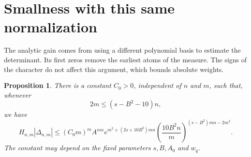 \documentclass[11pt]{article}
\newtheorem{proposition}[theorem]{Proposition}
\theoremstyle{remark}
\numberwithin{equation}{section}
\begin{document}
\section{Smallness with this same normalization}\label{sec:size}
The analytic gain comes from using a different polynomial basis to estimate
the determinant. Its first zeros remove the earliest atoms of the measure.
The signs of the character do not affect this argument, which bounds
absolute weights.

\begin{proposition}\label{prop:size}
There is a constant $C_0>0$, independent of $n$ and $m$, such that, whenever
\begin{equation}\label{eq:size-range}
 2m\leq(s-B^2-10)n,
\end{equation}
we have
\begin{equation}\label{eq:size-bound}
 H_{n,m}|\Delta_{n,m}|
 \leq (C_0m)^m A^{mn}e^{m^2+(2s+10B^2)mn}
       \left(\frac{10B^2 n}{m}\right)^{(s-B^2)mn-2m^2}.
\end{equation}
The constant may depend on the fixed parameters $s,B,A_0$ and $w_q$.
\end{proposition}
\end{document}

